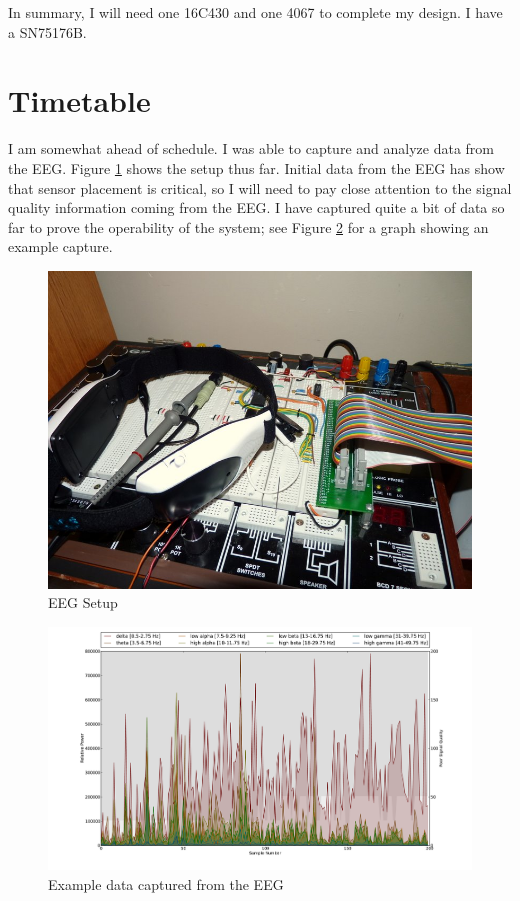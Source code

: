 \documentclass[letterpaper,10pt,notitlepage]{report}
\begin{document}
    In summary, I will need one 16C430 and one 4067 to complete my design.  I 
    have a SN75176B.

\section{Timetable}
    I am somewhat ahead of schedule.  I was able to capture and 
    analyze data from the EEG.  Figure \ref{fig:eeg} shows the setup thus far.  
    Initial data from the EEG has show that sensor placement is critical, so I 
    will need to pay close attention to the signal quality information coming 
    from the EEG.  I have captured quite a bit of data so far to prove the 
    operability of the system; see Figure \ref{fig:braindump} for a graph 
    showing an example capture.

    \begin{figure}[h!]
    \begin{center}
        \includegraphics[scale=.25]{fig/photo2.jpg}
        \caption{EEG Setup}
        \label{fig:eeg}
    \end{center}
    \end{figure}

    \begin{figure}[h!]
    \begin{center}
        \includegraphics[scale=.35]{fig/braindump6.pdf}
        \caption{Example data captured from the EEG}
        \label{fig:braindump}
    \end{center}
    \end{figure}
\end{document}

